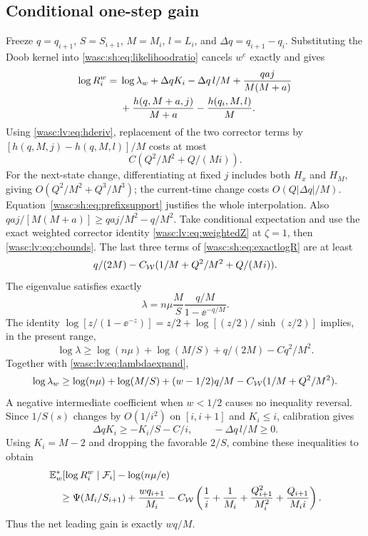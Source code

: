 \documentclass[11pt,a4paper]{article}
\theoremstyle{remark}\newtheorem{remark}[theorem]{Remark}
\numberwithin{equation}{section}
\begin{document}
\subsection{Conditional one-step gain}
Freeze $q=q_{i+1}$, $S=S_{i+1}$, $M=M_i$, $l=L_i$, and $\Delta q=q_{i+1}-q_i$.
Substituting the Doob kernel into \eqref{wasc:sh:eq:likelihoodratio} cancels $w^e$ exactly and gives
\begin{align}\label{wasc:sh:eq:exactlogR}
\log R_i^w={}&\log\lambda_w+\Delta qK_i-\Delta q\,l/M
+\frac{qaj}{M(M+a)}\notag\\
&+\frac{h(q,M+a,j)}{M+a}-\frac{h(q_i,M,l)}M.
\end{align}
Using \eqref{wasc:lv:eq:hderiv}, replacement of the two corrector terms by
$[h(q,M,j)-h(q,M,l)]/M$ costs at most
\begin{equation}\label{wasc:sh:eq:lowerreplacement}
C(Q^2/M^2+Q/(Mi)).
\end{equation}
For the next-state change, differentiating at fixed $j$ includes both $H_x$ and $H_M$, giving $O(Q^2/M^2+Q^3/M^3)$; the current-time change costs $O(Q|\Delta q|/M)$. Equation~\eqref{wasc:sh:eq:prefixsupport} justifies the whole interpolation.
Also
$qaj/[M(M+a)]\ge qaj/M^2-q/M^2$.
Take conditional expectation and use the exact weighted corrector identity
\eqref{wasc:lv:eq:weightedZ} at $\zeta=1$, then \eqref{wasc:lv:eq:cbounds}. The last three terms of \eqref{wasc:sh:eq:exactlogR} are at least
\begin{equation}\label{wasc:sh:eq:correctedlower}
q/(2M)-C_{\mathcal W}(1/M+Q^2/M^2+Q/(Mi)).
\end{equation}
The eigenvalue satisfies exactly
\[
\lambda=n\mu\frac MS\frac{q/M}{1-\ee^{-q/M}}.
\]
The identity
$\log[z/(1-\ee^{-z})]=z/2+\log[(z/2)/\sinh(z/2)]$ implies, in the present range,
\[
\log\lambda\ge\log(n\mu)+\log(M/S)+q/(2M)-Cq^2/M^2.
\]
Together with \eqref{wasc:lv:eq:lambdaexpand},
\begin{equation}\label{wasc:sh:eq:weightedeigenlower}
\log\lambda_w\ge\log(n\mu)+\log(M/S)
+(w-1/2)q/M-C_{\mathcal W}(1/M+Q^2/M^2).
\end{equation}
A negative intermediate coefficient when $w<1/2$ causes no inequality reversal.
Since $1/S(s)$ changes by $O(1/i^2)$ on $[i,i+1]$ and $K_i\le i$, calibration gives
\[
\Delta qK_i\ge-K_i/S-C/i,\qquad -\Delta q\,l/M\ge0.
\]
Using $K_i=M-2$ and dropping the favorable $2/S$, combine these inequalities to obtain
\begin{align}\label{wasc:sh:eq:lowerstep}
&\mathbb E_w^*[\log R_i^w\mid\mathcal F_i]-\log(n\mu/\mathrm e)\notag\\
&\quad\ge\Psi(M_i/S_{i+1})+\frac{wq_{i+1}}{M_i}
-C_{\mathcal W}\left(\frac1i+\frac1{M_i}+\frac{Q_{i+1}^2}{M_i^2}+
\frac{Q_{i+1}}{M_i i}\right).
\end{align}
Thus the net leading gain is exactly $wq/M$.
\end{document}
